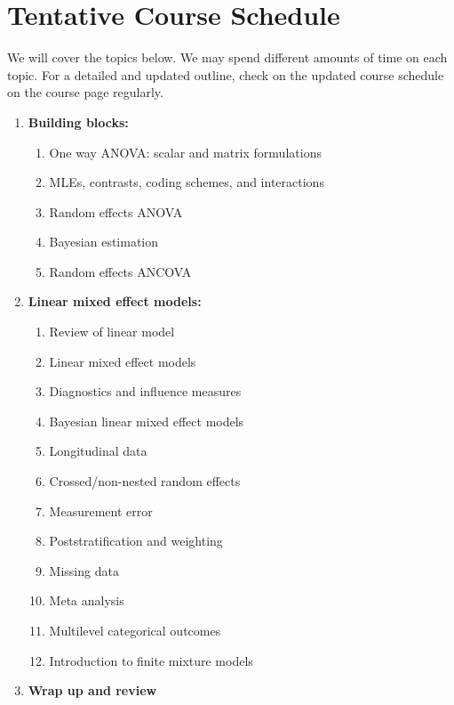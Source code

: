 \documentclass[11pt, a4paper]{article}
\begin{document}
\section{Tentative Course Schedule} 
We will cover the topics below. We may spend different amounts of time on each topic. For a detailed and updated outline, check on the updated course schedule on the course page regularly. 
\begin{enumerate}[label= {\color{darkblue}{\ArrowBoldRightStrobe}}]
	\item \textbf{Building blocks:}
	\begin{enumerate}[label= {\color{cyan}{\Rectangle}}]
		\item One way ANOVA: scalar and matrix formulations
		\item MLEs, contrasts, coding schemes, and interactions
		\item Random effects ANOVA
		\item Bayesian estimation
		\item Random effects ANCOVA
	\end{enumerate}

	\item \textbf{Linear mixed effect models: }
	\begin{enumerate}[label= {\color{cyan}{\Rectangle}}]
		\item Review of linear model
		\item Linear mixed effect models
		\item Diagnostics and influence measures
		\item Bayesian linear mixed effect models
		\item Longitudinal data
		\item Crossed/non-nested random effects
		\item Measurement error
		\item Poststratification and weighting
		\item Missing data
		\item Meta analysis
		\item Multilevel categorical outcomes
		\item Introduction to finite mixture models 
	\end{enumerate}
	
	\item \textbf{Wrap up and review}
\end{enumerate}
\end{document}
